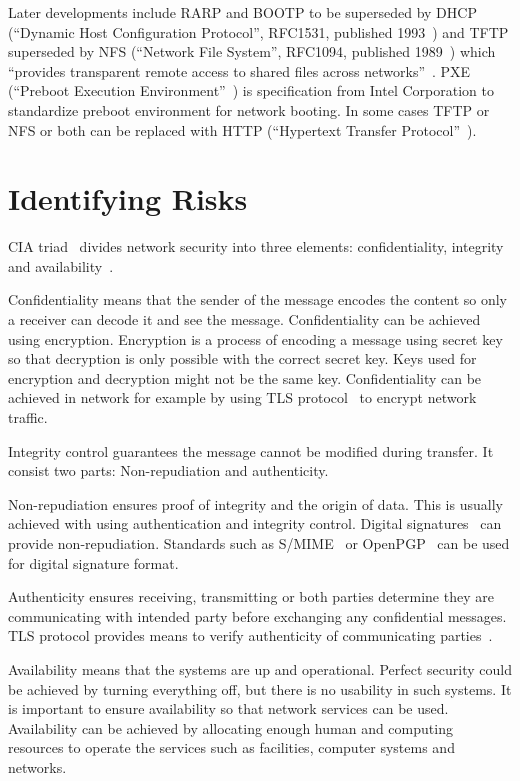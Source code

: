 Later developments include RARP and BOOTP to be superseded by DHCP
(``Dynamic Host Configuration Protocol'', RFC1531, published
1993~\cite{RFC1531}) and TFTP superseded by NFS (``Network File
System'', RFC1094, published 1989~\cite{RFC1094}) which ``provides
transparent remote access to shared files across
networks''~\cite{RFC1094}. PXE (``Preboot Execution
Environment''~\cite{PXEspec}) is specification from Intel Corporation
to standardize preboot environment for network booting. In some cases
TFTP or NFS or both can be replaced with HTTP (``Hypertext Transfer
Protocol''~\cite{RFC1945}\cite{RFC2616}).


\section{Identifying Risks}

CIA triad~\cite{cia-triad} divides network security into three
elements: confidentiality, integrity and availability~\cite{anderson}.

Confidentiality means that the sender of the message encodes the
content so only a receiver can decode it and see the
message. Confidentiality can be achieved using encryption. Encryption
is a process of encoding a message using secret key so that decryption
is only possible with the correct secret key. Keys used for encryption
and decryption might not be the same key. Confidentiality can be
achieved in network for example by using TLS protocol~\cite{RFC5246}
to encrypt network traffic.

Integrity control guarantees the message cannot be modified during
transfer. It consist two parts: Non-repudiation and authenticity.

Non-repudiation ensures proof of integrity and the origin of
data. This is usually achieved with using authentication and integrity
control. Digital signatures~\cite{Diffie2006}\cite{Goldwasser1988} can
provide non-repudiation. Standards such as S/MIME~\cite{RFC5751} or
OpenPGP~\cite{RFC4880} can be used for digital signature format.

Authenticity ensures receiving, transmitting or both parties determine
they are communicating with intended party before exchanging any
confidential messages. TLS protocol provides means to verify
authenticity of communicating parties~\cite{RFC5246}.

Availability means that the systems are up and operational. Perfect
security could be achieved by turning everything off, but there is no
usability in such systems. It is important to ensure availability so
that network services can be used. Availability can be achieved by
allocating enough human and computing resources to operate the
services such as facilities, computer systems and networks.

